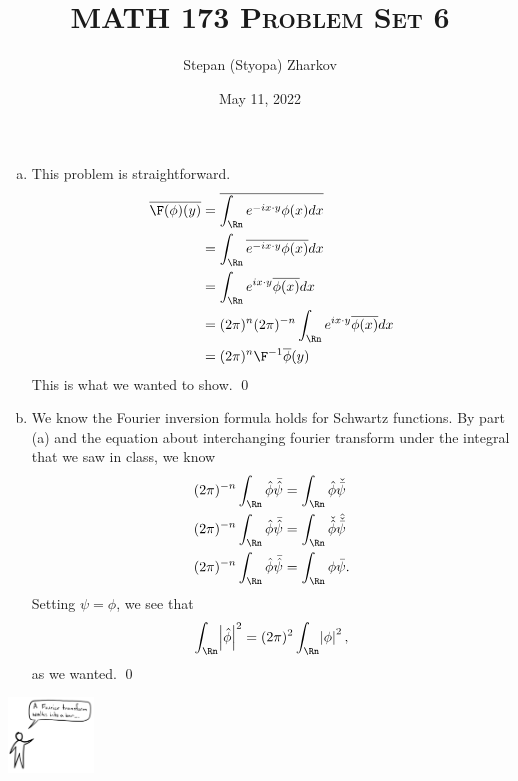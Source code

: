 \documentclass{article}
\title{\textsc{MATH 173 Problem Set 6}}
\author{Stepan (Styopa) Zharkov}
\date{May 11, 2022}
\begin{document}
\maketitle
{} 
 \tri
\hop 
\solution
\begin{enumerate}[(a)]
    \item This problem is straightforward. 
    \begin{align*}
        \ol{\F(\phi)(y)} &= \ol {\int_\Rn e^{-ix \cdot y}\phi(x)dx} \\
        &= \int_\Rn \ol {e^{-ix \cdot y}\phi(x)}dx \\
        &= \int_\Rn e^{ix \cdot y}\ol{\phi(x)}dx \\
        &= (2\pi)^n(2\pi)^{-n}\int_\Rn e^{ix \cdot y}\ol{\phi(x)}dx \\
        &= (2\pi)^n\F\inv\ol{\phi}(y) 
    \end{align*}
    This is what we wanted to show. \qed 
    \item We know the Fourier inversion formula holds for Schwartz functions. By part (a) and the equation about interchanging fourier transform under the integral that we saw in class, we know 
    \begin{align*}
        (2\pi)^{-n}\int_\Rn \hat{\phi}\bar{\hat{\psi}} &= \int_\Rn \hat{\phi}\check{\bar{\psi}}  \\
        (2\pi)^{-n}\int_\Rn \hat{\phi}\bar{\hat{\psi}} &= \int_\Rn \check{\hat{\phi}}\hat{\check{\bar{\psi}}}  \\
        (2\pi)^{-n}\int_\Rn \hat{\phi}\bar{\hat{\psi}} &= \int_\Rn \phi\bar{\psi}.
    \end{align*}
    Setting $\psi = \phi$, we see that 
    \begin{align*}
        \int_\Rn \abs{\hat{\phi}}^2 = (2\pi)^2\int_\Rn \abs{{\phi}}^2,
    \end{align*}
    as we wanted. \qed
\end{enumerate}

\begin{center}
    \includegraphics[height=2cm]{../images/fbar}
\end{center}
\end{document}
